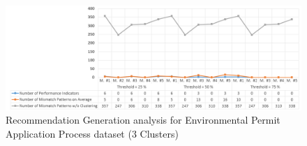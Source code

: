 \begin{itemize}
	\begin{figure}
		\centering
		\includegraphics[width=\textwidth]{5_results_discussions/coselog-wabo/recommendation-generation-analysis-k3}
		\caption{Recommendation Generation analysis for Environmental Permit Application Process dataset (3 Clusters)}
	  \label{fig:coselog-wabo-recommendation-generation-analysis-k3}
	\end{figure}
\end{itemize}
